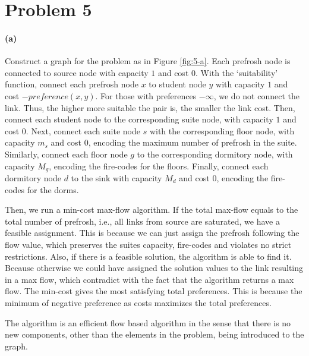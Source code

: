\documentclass[12pt]{article}
\begin{document}
\pagebreak

\section*{Problem 5}
\paragraph{(a)} Construct a graph for the problem as in Figure \ref{fig:5-a}. Each prefrosh node is connected to source node with capacity $1$ and cost $0$. With the `suitability' function, connect each prefrosh node $x$ to student node $y$ with capacity $1$ and cost $-preference(x,y)$. For those with preferences $-\infty$, we do not connect the link. Thus, the higher more suitable the pair is, the smaller the link cost. Then, connect each student node to the corresponding suite node, with capacity $1$ and cost $0$. Next, connect each suite node $s$ with the corresponding floor node, with capacity $m_s$ and cost $0$, encoding the maximum number of prefrosh in the suite. Similarly, connect each floor node $g$ to the corresponding dormitory node, with capacity $M_g$, encoding the fire-codes for the floors. Finally, connect each dormitory node $d$ to the sink with capacity $M_d$ and cost $0$, encoding the fire-codes for the dorms.

Then, we run a min-cost max-flow algorithm. If the total max-flow equals to the total number of prefrosh, i.e., all links from source are saturated, we have a feasible assignment. This is because we can just assign the prefrosh following the flow value, which preserves the suites capacity, fire-codes and violates no strict restrictions. Also, if there is a feasible solution, the algorithm is able to find it. Because otherwise we could have assigned the solution values to the link resulting in a max flow, which contradict with the fact that the algorithm returns a max flow. The min-cost gives the most satisfying total preferences. This is because the minimum of negative preference as costs maximizes the total preferences. 

The algorithm is an efficient flow based algorithm in the sense that there is no new components, other than the elements in the problem, being introduced to the graph. 
 
\end{document}
